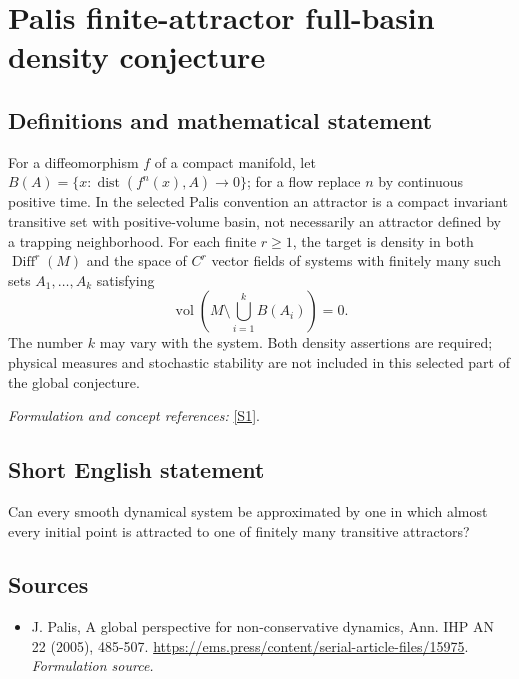 \documentclass[11pt]{article}
\begin{document}
\section*{\texorpdfstring{Palis finite-attractor full-basin density conjecture}{Palis finite-attractor full-basin density conjecture}}\label{205}
\subsection{Definitions and mathematical statement}
For a diffeomorphism $f$ of a compact manifold, let
$B(A)=\{x:\operatorname{dist}(f^n(x),A)\to0\}$; for a flow replace $n$ by continuous positive time. In the selected Palis convention an attractor is a compact invariant transitive set with positive-volume basin, not necessarily an attractor defined by a trapping neighborhood. For each finite $r\ge1$, the target is density in both $\operatorname{Diff}^r(M)$ and the space of $C^r$ vector fields of systems with finitely many such sets $A_1,\ldots,A_k$ satisfying
\[
 \operatorname{vol}\left(M\setminus\bigcup_{i=1}^k B(A_i)\right)=0.
\]
The number $k$ may vary with the system. Both density assertions are required; physical measures and stochastic stability are not included in this selected part of the global conjecture.
\par\smallskip\textit{Formulation and concept references:} \href{https://ems.press/content/serial-article-files/15975}{[S1]}.

\subsection{Short English statement}
Can every smooth dynamical system be approximated by one in which almost every initial point is attracted to one of finitely many transitive attractors?
\subsection{Sources}
\begin{itemize}
\item[S1]J. Palis, A global perspective for non-conservative dynamics, Ann. IHP AN 22 (2005), 485-507.
\url{https://ems.press/content/serial-article-files/15975}.
\textit{Formulation source.}
\end{itemize}
\end{document}
